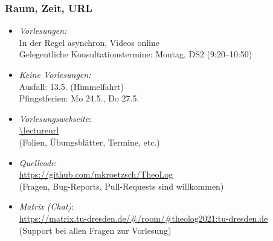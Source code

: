 \documentclass[aspectratio=1610,onlymath]{beamer}
\begin{document}
\maketitle



%
%

\begin{frame}\frametitle{Raum, Zeit, URL}

\begin{itemize}
\item \emph{Vorlesungen:}\\
	In der Regel asynchron, Videos online\\
	Gelegentliche Konsultationstermine: Montag, DS2 (9:20--10:50)
\item \emph{Keine Vorlesungen:}\\
	Ausfall: 13.5. (Himmelfahrt)\\
	Pfingstferien: Mo 24.5., Do 27.5.
\item \emph{Vorlesungswebseite}:\\[0.5ex]
	\url{\lectureurl}\\[0.5ex]
	(Folien, Übungsblätter, Termine, etc.)
\item \emph{Quellcode}:\\[0.5ex]
	\url{https://github.com/mkroetzsch/TheoLog}\\[0.5ex]
	(Fragen, Bug-Reports, Pull-Requests sind willkommen)
\item \emph{Matrix (Chat)}:\\[0.5ex]
	\url{https://matrix.tu-dresden.de/\#/room/\#theolog2021:tu-dresden.de}\\[0.5ex]
	(Support bei allen Fragen zur Vorlesung)
\end{itemize}

\end{frame}
\end{document}
